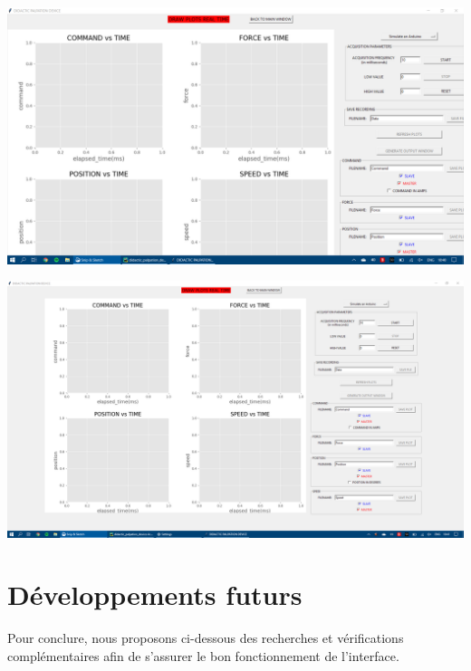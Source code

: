 \begin{center}
    
    \includegraphics[width=17cm]{images/windows_scaling_4.png}
    \label{fig:scale125}
    
    \includegraphics[width=17cm]{images/windows_scaling_5.png}

\end{center}

\newpage
\section{Développements futurs}

Pour conclure, nous proposons ci-dessous des recherches et vérifications complémentaires afin de s'assurer le bon fonctionnement de l'interface.

